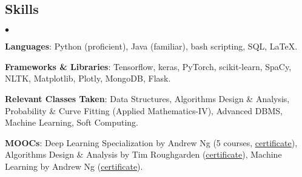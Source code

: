\documentclass[margin,line]{res}
\newenvironment{list2}{
  \begin{list}{$\bullet$}{%
      \setlength{\itemsep}{0in}
      \setlength{\parsep}{0in} \setlength{\parskip}{0in}
      \setlength{\topsep}{0in} \setlength{\partopsep}{0in}
      \setlength{\leftmargin}{0.2in}}}{\end{list}}
\begin{document}
\begin{resume}
\section{\sc Skills}
\begin{list2}
\item {\bf Languages}: Python (proficient), Java (familiar), bash scripting, SQL, \LaTeX. 
\item {\bf Frameworks \& Libraries}: Tensorflow, keras, PyTorch, scikit-learn, SpaCy, NLTK, Matplotlib, Plotly, MongoDB, Flask.
\item {\bf Relevant Classes Taken}: Data Structures, Algorithms Design \& Analysis, Probability \& Curve Fitting (Applied Mathematics-IV), Advanced DBMS, Machine Learning, Soft Computing.
\item {\bf MOOCs}: Deep Learning Specialization by Andrew Ng (5 courses, {\href{https://www.coursera.org/account/accomplishments/specialization/WK4DU58W9DV5}{\underline{certificate}}}), Algorithms Design \& Analysis by Tim Roughgarden ({\href{https://www.coursera.org/account/accomplishments/verify/S8RN7R4ZZQSR}{\underline{certificate}}}), Machine Learning by Andrew Ng ({\href{https://www.coursera.org/account/accomplishments/verify/37T4VG9ZN7EY}{\underline{certificate}}}).
\end{list2}


\end{resume}
\end{document}
